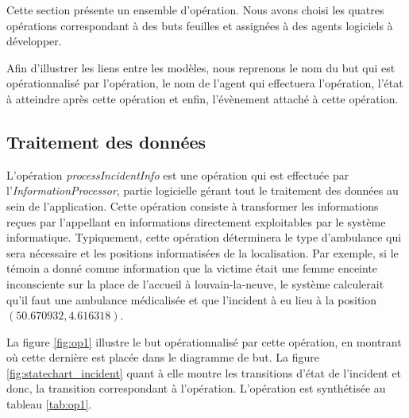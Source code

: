 Cette section présente un ensemble d'opération. Nous avons choisi les quatres
opérations correspondant à des buts feuilles et assignées à des agents logiciels
à développer.

Afin d'illustrer les liens entre les modèles, nous reprenons le nom du but
qui est opérationnalisé par l'opération, le nom de l'agent qui effectuera 
l'opération, l'état à atteindre après cette opération et enfin, l'évènement
attaché à cette opération.

\subsection{Traitement des données}

	L'opération \textit{processIncidentInfo} est une opération qui est effectuée par l'\textit{InformationProcessor},
	partie logicielle gérant tout le traitement des données au sein de
	l'application. Cette opération consiste à transformer les informations
	reçues par l'appellant en informations directement exploitables par le
	système informatique. Typiquement, cette opération déterminera 
	le type d'ambulance qui sera nécessaire et les positions \og informatisées \fg
	de la localisation. Par exemple, si le témoin a donné comme information
	que la victime était une femme enceinte inconsciente sur la place de l'accueil
	à louvain-la-neuve, le système calculerait qu'il faut une ambulance
	médicalisée et que l'incident à eu lieu à la position $(50.670932,4.616318)$.
	
	La figure \ref{fig:op1} illustre le but opérationnalisé par cette opération,
	en montrant où cette dernière est placée dans le diagramme de but. La figure
	\ref{fig:statechart_incident} quant à elle montre les transitions d'état 
	de l'incident et donc, la transition correspondant à l'opération. 
	L'opération est synthétisée au tableau \ref{tab:op1}.
	
	\vfill
	\vfill
	
